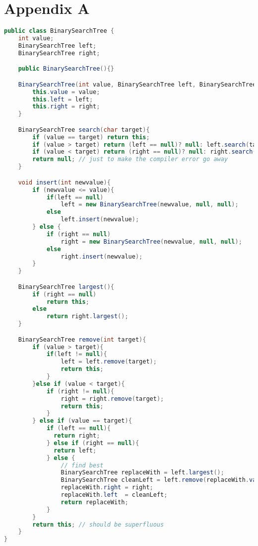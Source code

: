 \documentclass[twoside=false,DIV=14]{scrartcl}
\begin{document}
\newpage
\part*{Appendix A}
{\small
\begin{lstlisting}[language=java]
public class BinarySearchTree {
    int value;
    BinarySearchTree left;
    BinarySearchTree right;

    public BinarySearchTree(){}

    BinarySearchTree(int value, BinarySearchTree left, BinarySearchTree right){
        this.value = value;
        this.left = left;
        this.right = right;
    }

    BinarySearchTree search(char target){
        if (value == target) return this;
        if (value > target) return (left == null)? null: left.search(target);
        if (value < target) return (right == null)? null: right.search(target);
        return null; // just to make the compiler error go away
    }

    void insert(int newvalue){
        if (newvalue <= value){
            if(left == null)
                left = new BinarySearchTree(newvalue, null, null);
            else
                left.insert(newvalue);
        } else {
            if (right == null)
                right = new BinarySearchTree(newvalue, null, null);
            else
                right.insert(newvalue);
        }
    }

    BinarySearchTree largest(){
        if (right == null)
            return this;
        else
            return right.largest();
    }

    BinarySearchTree remove(int target){
        if (value > target){
            if(left != null){
                left = left.remove(target);
                return this;
            }
        }else if (value < target){
            if (right != null){
                right = right.remove(target);
                return this;
            }
        } else if (value == target){
            if (left == null){
              return right;
            } else if (right == null){
              return left;
            } else {
                // find best
                BinarySearchTree replaceWith = left.largest();
                BinarySearchTree cleanLeft = left.remove(replaceWith.value);
                replaceWith.right = right;
                replaceWith.left  = cleanLeft;
                return replaceWith;
            }
        }
        return this; // should be superfluous
    }
}
\end{lstlisting}}
\end{document}
